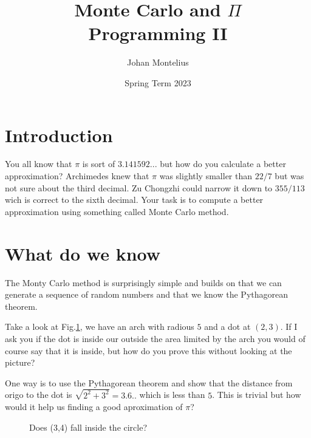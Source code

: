 \documentclass[a4paper,11pt]{article}
\begin{document}
\title{
    \textbf{Monte Carlo and $\Pi$}\\
    \large{Programming II}
}
\author{Johan Montelius}
\date{Spring Term 2023}
\maketitle
{}


\section*{Introduction}

You all know that $\pi$ is sort of $3.141592...$ but how do you
calculate a better approximation? Archimedes knew that $\pi$ was
slightly smaller than $22/7$ but was not sure about the third
decimal. Zu Chongzhi could narrow it down to $355/113$ wich is correct
to the sixth decimal. Your task is to compute a better approximation
using something called Monte Carlo method.

\section*{What do we know}


The Monty Carlo method is surprisingly simple and builds on that we
can generate a sequence of random numbers and that we know the
Pythagorean theorem.

Take a look at Fig.\ref{fig:pyth}, we have an arch with radious $5$
and a dot at $(2,3)$. If I ask you if the dot is inside our outside
the area limited by the arch you would of course say that it is
inside, but how do you prove this without looking at the picture?

One way is to use the Pythagorean theorem and show that the distance
from origo to the dot is $\sqrt{2^2 + 3^2} = 3.6..$ which is less than
$5$. This is trivial but how would it help us finding a good aproximation of $\pi$? 


\begin{figure}[h]
\center
{}
\caption{Does (3,4) fall inside the circle?}
\label{fig:pyth}
\end{figure}
\end{document}

